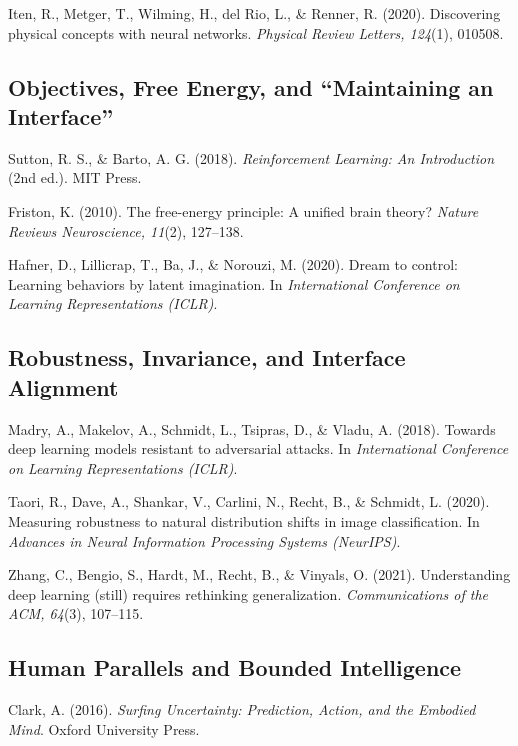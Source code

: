 \documentclass[
  openright]{book}
\begin{document}
Iten, R., Metger, T., Wilming, H., del Rio, L., \& Renner, R. (2020).
Discovering physical concepts with neural networks. \emph{Physical
Review Letters, 124}(1), 010508.

\subsection{Objectives, Free Energy, and ``Maintaining an
Interface''}\label{objectives-free-energy-and-maintaining-an-interface}

Sutton, R. S., \& Barto, A. G. (2018). \emph{Reinforcement Learning: An
Introduction} (2nd ed.). MIT Press.

Friston, K. (2010). The free-energy principle: A unified brain theory?
\emph{Nature Reviews Neuroscience, 11}(2), 127--138.

Hafner, D., Lillicrap, T., Ba, J., \& Norouzi, M. (2020). Dream to
control: Learning behaviors by latent imagination. In
\emph{International Conference on Learning Representations (ICLR)}.

\subsection{Robustness, Invariance, and Interface
Alignment}\label{robustness-invariance-and-interface-alignment}

Madry, A., Makelov, A., Schmidt, L., Tsipras, D., \& Vladu, A. (2018).
Towards deep learning models resistant to adversarial attacks. In
\emph{International Conference on Learning Representations (ICLR)}.

Taori, R., Dave, A., Shankar, V., Carlini, N., Recht, B., \& Schmidt, L.
(2020). Measuring robustness to natural distribution shifts in image
classification. In \emph{Advances in Neural Information Processing
Systems (NeurIPS)}.

Zhang, C., Bengio, S., Hardt, M., Recht, B., \& Vinyals, O. (2021).
Understanding deep learning (still) requires rethinking generalization.
\emph{Communications of the ACM, 64}(3), 107--115.

\subsection{Human Parallels and Bounded
Intelligence}\label{human-parallels-and-bounded-intelligence}

Clark, A. (2016). \emph{Surfing Uncertainty: Prediction, Action, and the
Embodied Mind}. Oxford University Press.
\end{document}
